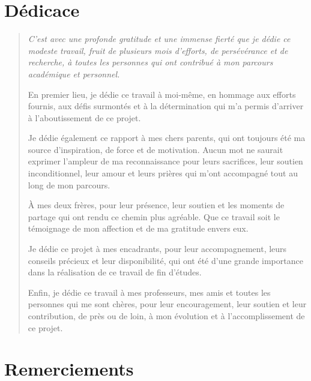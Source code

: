 \documentclass[a4paper,12pt,oneside]{report}
\begin{document}
	
	
	\chapter*{D\'edicace}
	\thispagestyle{plain}
	
	\begin{quote}\itshape
		C'est avec une profonde gratitude et une immense fiert\'e que je d\'edie ce modeste travail, fruit de plusieurs mois d'efforts, de pers\'ev\'erance et de recherche, \`a toutes les personnes qui ont contribu\'e \`a mon parcours acad\'emique et personnel.
		
		\medskip
		En premier lieu, je d\'edie ce travail \`a moi-m\^eme, en hommage aux efforts fournis, aux d\'efis surmont\'es et \`a la d\'etermination qui m'a permis d'arriver \`a l'aboutissement de ce projet.
		
		\medskip
		Je d\'edie \'egalement ce rapport \`a mes chers parents, qui ont toujours \'et\'e ma source d'inspiration, de force et de motivation. Aucun mot ne saurait exprimer l'ampleur de ma reconnaissance pour leurs sacrifices, leur soutien inconditionnel, leur amour et leurs pri\`eres qui m'ont accompagn\'e tout au long de mon parcours.
		
		\medskip
		\`A mes deux fr\`eres, pour leur pr\'esence, leur soutien et les moments de partage qui ont rendu ce chemin plus agr\'eable. Que ce travail soit le t\'emoignage de mon affection et de ma gratitude envers eux.
		
		\medskip
		Je d\'edie ce projet \`a mes encadrants, pour leur accompagnement, leurs conseils pr\'ecieux et leur disponibilit\'e, qui ont \'et\'e d'une grande importance dans la r\'ealisation de ce travail de fin d'\'etudes.
		
		\medskip
		Enfin, je d\'edie ce travail \`a mes professeurs, mes amis et toutes les personnes qui me sont ch\`eres, pour leur encouragement, leur soutien et leur contribution, de pr\`es ou de loin, \`a mon \'evolution et \`a l'accomplissement de ce projet.
	\end{quote}
	
	\chapter*{Remerciements}
	\thispagestyle{plain}
	
\end{document}
